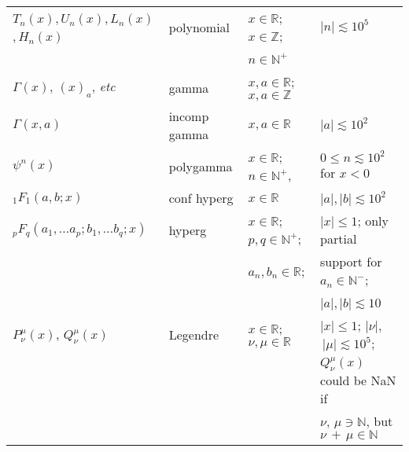 \begin{table}[p]
\begin{center}
\begin{tabular}{l|l|l|l}
$T_{n}(x)$,$\,U_{n}(x)$,$\,L_{n}(x)$,$\,H_{n}(x)$
             & polynomial
             & $x \in \mathbb{R}$; $x \in \mathbb{Z}$;
             & $\left|n\right| \lesssim 10^{5}$ \\

\ %
             & \ %
             & $n \in \mathbb{N}^{+}$
             & \ \\

$\Gamma(x)$, $(x)_{a}$, {\it etc}
             & gamma
             & $x, a \in \mathbb{R}$; $x, a \in \mathbb{Z}$
             & \ \\

$\Gamma(x, a)$
             & incomp gamma
             & $x, a \in \mathbb{R}$
             & $\left|a\right| \lesssim 10^{2}$ \\

$\psi^{n}(x)$
             & poly\-gamma
             & $x \in \mathbb{R}$; $n \in \mathbb{N}^{+}$,
             & $0 \leq n \lesssim 10^{2}$ for $x < 0$ \\

$_{1}F_{1}(a, b; x)$
             & conf hyperg
             & $x \in \mathbb{R}$
             & $\left|a\right|$,$\,\left|b\right| \lesssim 10^{2}$ \\

$_{p}F_{q}(a_{1},\dots a_{p}; b_{1},\dots b_{q}; x)$
             & hyperg
             & $x \in \mathbb{R}$; $p,q \in \mathbb{N}^{+}$;
             & $\left|x\right| \leq 1$; only partial \\

\ %
             & \ %
             & $a_{n}, b_{n} \in \mathbb{R}$;
             & support for $a_{n} \in \mathbb{N}^{-}$; \\

\ %
             & \ %
             & \ %
             & $\left|a\right|$,$\,\left|b\right| \lesssim 10$ \\

$P_{\nu}^{\mu}(x)$, $Q_{\nu}^{\mu}(x)$
             & Legendre
             & $x \in \mathbb{R}$; $\nu,\mu \in \mathbb{R}$
             & $\left|x\right| \leq 1$; $\left|\nu\right|$,$\,\left|\mu\right| \lesssim 10^{5}$; \\

\ %
             & \ %
             & \ %
             & $Q_{\nu}^{\mu}(x)$ could be NaN if \\

\ %
             & \ %
             & \ %
             & $\nu$, $\mu \ni\mathbb{N}$, but $\nu$$\,+\,$$\mu\in\mathbb{N}$ \\


\end{tabular}
\end{center}
\end{table}

